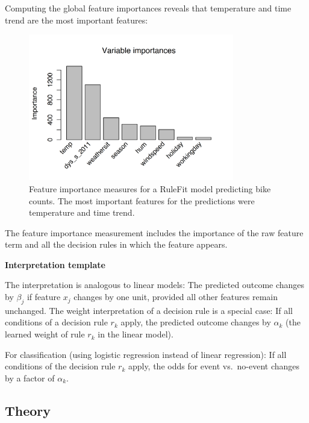 \documentclass[
  10pt,
]{scrbook}
\begin{document}
Computing the global feature importances reveals that temperature and time trend are the most important features:

\begin{figure}

{\centering \includegraphics[width=0.8\textwidth]{images/rulefit-importance-1} 

}

\caption{Feature importance measures for a RuleFit model predicting bike counts. The most important features for the predictions were temperature and time trend.}\label{fig:rulefit-importance}
\end{figure}

The feature importance measurement includes the importance of the raw feature term and all the decision rules in which the feature appears.

\textbf{Interpretation template}

The interpretation is analogous to linear models:
The predicted outcome changes by \(\beta_j\) if feature \(x_j\) changes by one unit, provided all other features remain unchanged.
The weight interpretation of a decision rule is a special case:
If all conditions of a decision rule \(r_k\) apply, the predicted outcome changes by \(\alpha_k\) (the learned weight of rule \(r_k\) in the linear model).

For classification (using logistic regression instead of linear regression):
If all conditions of the decision rule \(r_k\) apply, the odds for event vs.~no-event changes by a factor of \(\alpha_k\).

\hypertarget{theory-1}{%
\subsection{Theory}\label{theory-1}}
\end{document}
